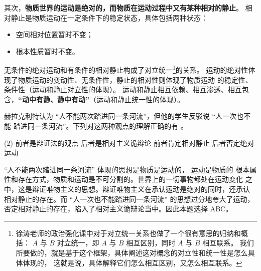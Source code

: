 \documentclass[10pt, UTF8]{book} %
\begin{document}
其次，\textbf{物质世界的运动是绝对的，而物质在运动过程中又有某种相对的静止}。
相对静止是物质运动在一定条件下的稳定状态，具体包括两种状态：
\begin{itemize}[itemsep=0pt]
    \item 空间相对位置暂时不变；
    \item 根本性质暂时不变。
\end{itemize}
无条件的绝对运动和有条件的相对静止构成了对立统一\footnote{
    徐涛老师的政治强化课中对于对立统一关系也做了一个很有意思的归纳和概括：
    $A$ 与 $B$ 对立统一，即 $A$ 与 $B$ 相互区别，同时 $A$ 与 $B$ 相互联系。
    我们所要做的，就是基于这个框架，具体阐述这对概念的对立性和统一性是怎么具体体现的，
    这就是说，具体解释它们怎么相互区别，又怎么相互联系。
}的关系。
运动的绝对性体现了物质运动的变动性、无条件性，静止的相对性则体现了物质运动
的稳定性、条件性（运动和静止对立性的体现）。
运动和静止相互依赖、相互渗透、相互包含，\textbf{“动中有静、静中有动”}（运动和静止统一性的体现）。
%         

\begin{example}
    赫拉克利特认为 “人不能两次踏进同一条河流”，但他的学生反驳说 “人一次也不能
    踏进同一条河流”。下列对这两种观点的理解正确的有 \underline{\qquad \qquad \qquad}。
    \begin{tasks}[label={\Alph*.}](2)
        \task 前者是辩证法的观点
        \task 后者是相对主义诡辩论
        \task 前者肯定相对静止
        \task 后者否定绝对运动
    \end{tasks}
    \begin{cmt}
        “人不能两次踏进同一条河流” 体现的思想是物质是运动的， 运动是物质的
        根本属性和存在方式，物质和运动是不可分割的。世界上的一切事物都处在运动变化
        之中，这是辩证唯物主义的思想。辩证唯物主义在承认运动是绝对的同时，还承认
        相对静止的存在。而 “人一次也不能踏进同一条河流” 的思想过分地夸大了运动，
        否定相对静止的存在，陷入了相对主义诡辩论当中。因此本题选择 ABC。
    \end{cmt}
\end{example}
\end{document}
